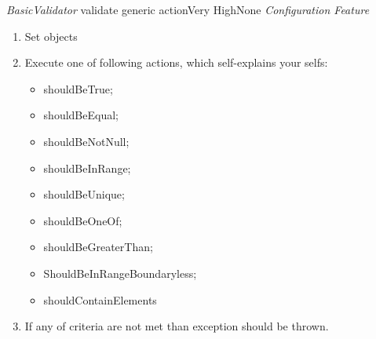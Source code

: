 \begin{testcase}{\emph{BasicValidator} validate generic action}{Very High}{None}
	{
		\emph{Configuration Feature}
	}
	{
		\begin{enumerate}
			\item Set objects
			\item
			{
				Execute one of following actions, which self-explains your selfs:
				\begin{itemize}
					\item shouldBeTrue;
					\item shouldBeEqual;
					\item shouldBeNotNull;
					\item shouldBeInRange;
					\item shouldBeUnique;
					\item shouldBeOneOf;
					\item shouldBeGreaterThan;
					\item ShouldBeInRangeBoundaryless;
					\item shouldContainElements
				\end{itemize}
			}
			\item If any of criteria are not met than exception should be thrown. 
		\end{enumerate}
	}
\end{testcase}

